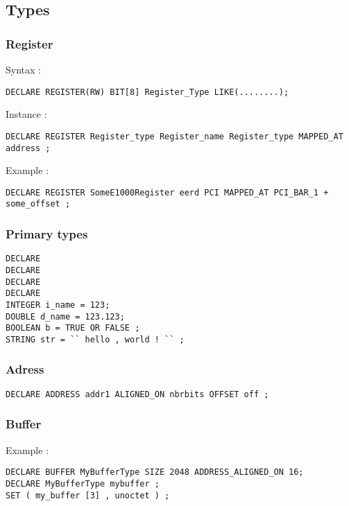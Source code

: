 \documentclass{rtxreport}
\begin{document}
\subsection{Types}

\subsubsection{Register}
Syntax :
\begin{lstlisting}
DECLARE REGISTER(RW) BIT[8] Register_Type LIKE(........);
\end{lstlisting}

Instance :
\begin{lstlisting}
DECLARE REGISTER Register_type Register_name Register_type MAPPED_AT
address ;
\end{lstlisting}

Example :
\begin{lstlisting}
DECLARE REGISTER SomeE1000Register eerd PCI MAPPED_AT PCI_BAR_1 +
some_offset ;
\end{lstlisting}


\subsubsection{Primary types}

\begin{lstlisting}
DECLARE
DECLARE
DECLARE
DECLARE
INTEGER i_name = 123;
DOUBLE d_name = 123.123;
BOOLEAN b = TRUE OR FALSE ;
STRING str = `` hello , world ! `` ;
\end{lstlisting}

\subsubsection{Adress}
\begin{lstlisting}
DECLARE ADDRESS addr1 ALIGNED_ON nbrbits OFFSET off ;
\end{lstlisting}

\subsubsection{Buffer}

Example :
\begin{lstlisting}
DECLARE BUFFER MyBufferType SIZE 2048 ADDRESS_ALIGNED_ON 16;
DECLARE MyBufferType mybuffer ;
SET ( my_buffer [3] , unoctet ) ;
\end{lstlisting}
\end{document}
